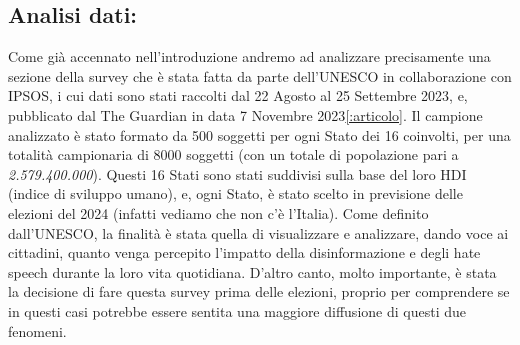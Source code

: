 \documentclass{article}
\begin{document}
\newpage\centering\subsection{Analisi dati:}

\begin{justify}    
Come già accennato nell'introduzione andremo ad analizzare precisamente una sezione della survey che è stata fatta da parte dell'UNESCO in collaborazione con IPSOS, i cui dati sono stati raccolti dal 22 Agosto al 25 Settembre 2023, e, pubblicato dal The Guardian in data 7 Novembre 2023\ref{:articolo}. \citep{Unesco}
Il campione analizzato è stato formato da 500 soggetti per ogni Stato dei 16 coinvolti, per una totalità campionaria di 8000 soggetti (con un totale di popolazione pari a \textit{2.579.400.000}).
Questi 16 Stati sono stati suddivisi sulla base del loro HDI (indice di sviluppo umano), e, ogni Stato, è stato scelto in previsione delle elezioni del 2024 (infatti vediamo che non c'è l'Italia).
Come definito dall'UNESCO, la finalità è stata quella di visualizzare e analizzare, dando voce ai cittadini, quanto venga percepito l'impatto della disinformazione e degli hate speech durante la loro vita quotidiana. D'altro canto, molto importante, è stata la decisione di fare questa survey prima delle elezioni, proprio per comprendere se in questi casi potrebbe essere sentita una maggiore diffusione di questi due fenomeni.
\end{justify}
\end{document}
